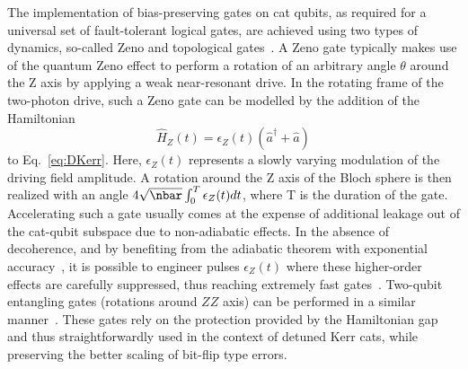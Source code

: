 The implementation of bias-preserving gates on cat qubits, as required for a universal set of fault-tolerant logical gates, are achieved using two types of dynamics, so-called Zeno and topological gates~\cite{Mirrahimi2014,Guillaud2019,Puri2020}. A Zeno gate typically makes use of the quantum Zeno effect to perform a rotation of an arbitrary angle $\theta$ around the Z axis by applying a weak near-resonant drive. In the rotating frame of the two-photon drive, such a Zeno gate can be modelled by the addition of the Hamiltonian 
\begin{equation}
    \hat H_Z(t) = \epsilon_Z(t) (\hat a^\dagger + \hat a)
    \label{eq:Z}
\end{equation}
to Eq.~\eqref{eq:DKerr}. Here, $\epsilon_Z(t)$ represents a slowly varying modulation of the driving field amplitude. A rotation around the Z axis of the Bloch sphere is then realized with an angle $4 \sqrt{\nbar} \int_0^T \epsilon_Z(t) dt$, where T is the duration of the gate. Accelerating such a gate usually comes at the expense of additional leakage out of the cat-qubit subspace due to non-adiabatic effects. In the absence of decoherence, and by benefiting from the adiabatic theorem with exponential accuracy~\cite{teufel:book}, it is possible to engineer pulses $\epsilon_Z(t)$ where these higher-order effects are carefully suppressed, thus reaching extremely fast gates~\cite{Xu2021}. Two-qubit entangling gates (rotations around $ZZ$ axis) can be performed in a similar manner~\cite{Mirrahimi2014}. These gates rely on the protection provided by the Hamiltonian gap and thus straightforwardly used in the context of detuned Kerr cats, while preserving the better scaling of bit-flip type errors.

